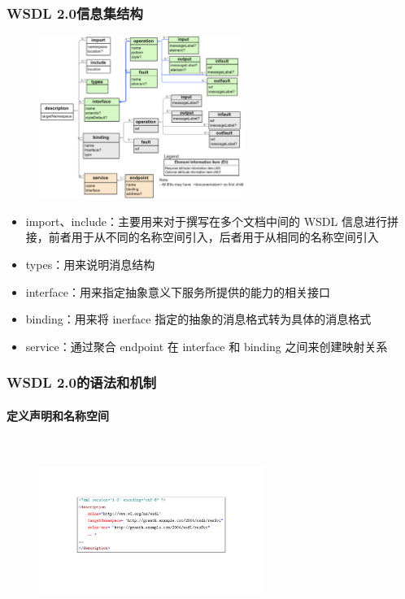 \subsubsection{WSDL 2.0信息集结构}
\begin{figure}[H]
    \vspace{-1em}
	\centering
	\includegraphics[width=0.6\textwidth]{images/WSDL 2.0信息集结构.png}
    \vspace{-2.5em}
\end{figure}

\begin{itemize}
    \item import、include：主要用来对于撰写在多个文档中间的 WSDL 信息进行拼接，前者用于从不同的名称空间引入，后者用于从相同的名称空间引入
    \item types：用来说明消息结构
    \item interface：用来指定抽象意义下服务所提供的能力的相关接口
    \item binding：用来将 inerface 指定的抽象的消息格式转为具体的消息格式
    \item service：通过聚合 endpoint 在 interface 和 binding 之间来创建映射关系
\end{itemize}

\subsubsection{WSDL 2.0的语法和机制}
\paragraph*{定义声明和名称空间}~{} \par
\begin{figure}[H]
    \vspace{-0.5em}
	\centering
	\includegraphics[width=0.65\textwidth]{images/定义声明和名称空间.pdf}
    \vspace{-1.5em}
\end{figure}

